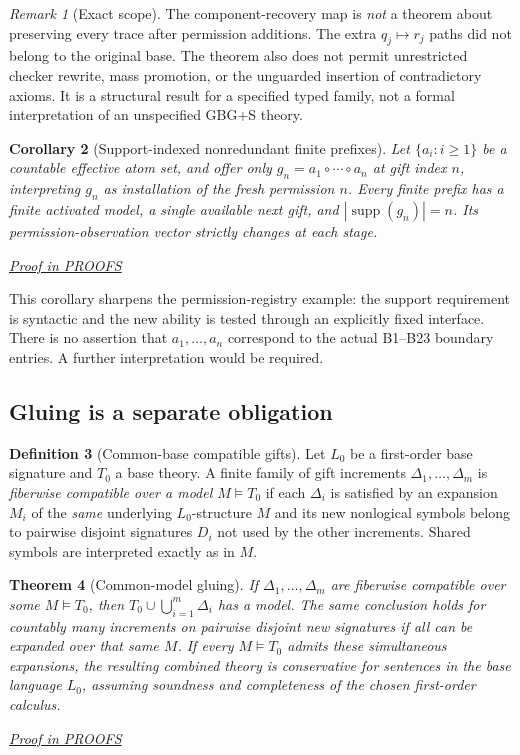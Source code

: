 \documentclass[11pt,letterpaper]{article}
\newtheorem{theorem}{Theorem}[section]
\newtheorem{corollary}[theorem]{Corollary}
\theoremstyle{definition}\newtheorem{definition}[theorem]{Definition}\newtheorem{example}[theorem]{Example}
\theoremstyle{remark}\newtheorem{remark}[theorem]{Remark}
\newcommand{\Supp}{\operatorname{supp}}
\newcommand{\prooflink}[1]{\par\noindent\hfill\small\hyperref[#1]{\textit{Proof in PROOFS}}\normalsize}
\begin{document}
\begin{remark}[Exact scope]
The component-recovery map is \emph{not} a theorem about preserving every trace after permission additions. The extra $q_j\mapsto r_j$ paths did not belong to the original base. The theorem also does not permit unrestricted checker rewrite, mass promotion, or the unguarded insertion of contradictory axioms. It is a structural result for a specified typed family, not a formal interpretation of an unspecified GBG+S theory.
\end{remark}

\begin{corollary}[Support-indexed nonredundant finite prefixes]\label{w1:co:support}
Let $\{a_i:i\ge1\}$ be a countable effective atom set, and offer only $g_n=a_1\circ\cdots\circ a_n$ at gift index $n$, interpreting $g_n$ as installation of the fresh permission $n$. Every finite prefix has a finite activated model, a single available next gift, and $|\Supp(g_n)|=n$. Its permission-observation vector strictly changes at each stage.
\prooflink{w1:pr:support}
\end{corollary}

This corollary sharpens the permission-registry example: the support requirement is syntactic and the new ability is tested through an explicitly fixed interface. There is no assertion that $a_1,\dots,a_n$ correspond to the actual B1--B23 boundary entries. A further interpretation would be required.

\subsection{Gluing is a separate obligation}
\begin{definition}[Common-base compatible gifts]\label{w1:def:compatible}
Let $L_0$ be a first-order base signature and $T_0$ a base theory. A finite family of gift increments $\Delta_1,\dots,\Delta_m$ is \emph{fiberwise compatible over a model $M\models T_0$} if each $\Delta_i$ is satisfied by an expansion $M_i$ of the \emph{same} underlying $L_0$-structure $M$ and its new nonlogical symbols belong to pairwise disjoint signatures $D_i$ not used by the other increments. Shared symbols are interpreted exactly as in $M$.
\end{definition}

\begin{theorem}[Common-model gluing]\label{w1:th:glue}
If $\Delta_1,\dots,\Delta_m$ are fiberwise compatible over some $M\models T_0$, then $T_0\cup\bigcup_{i=1}^m\Delta_i$ has a model. The same conclusion holds for countably many increments on pairwise disjoint new signatures if all can be expanded over that same $M$. If every $M\models T_0$ admits these simultaneous expansions, the resulting combined theory is conservative for sentences in the base language $L_0$, assuming soundness and completeness of the chosen first-order calculus.
\prooflink{w1:pr:glue}
\end{theorem}
\end{document}
